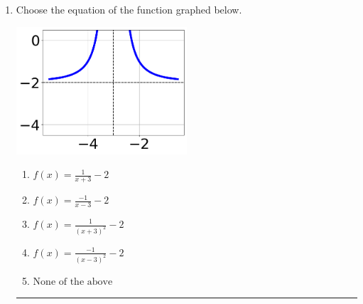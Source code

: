 \documentclass[14pt]{extbook}
\newcommand{\litem}[1]{\item#1\hspace*{-1cm}\rule{\textwidth}{0.4pt}}
\begin{document}
\begin{enumerate}
{\begin{enumerate}[label=\Alph*.]
\end{enumerate} }
\litem{
Choose the equation of the function graphed below.
\begin{center}
    \includegraphics[width=0.5\textwidth]{../Figures/rationalGraphToEquationB.png}
\end{center}
\begin{enumerate}[label=\Alph*.]
\item \( f(x) = \frac{1}{x + 3} - 2 \)
\item \( f(x) = \frac{-1}{x - 3} - 2 \)
\item \( f(x) = \frac{1}{(x + 3)^2} - 2 \)
\item \( f(x) = \frac{-1}{(x - 3)^2} - 2 \)
\item \( \text{None of the above} \)

\end{enumerate} }
\end{enumerate}
\end{document}
